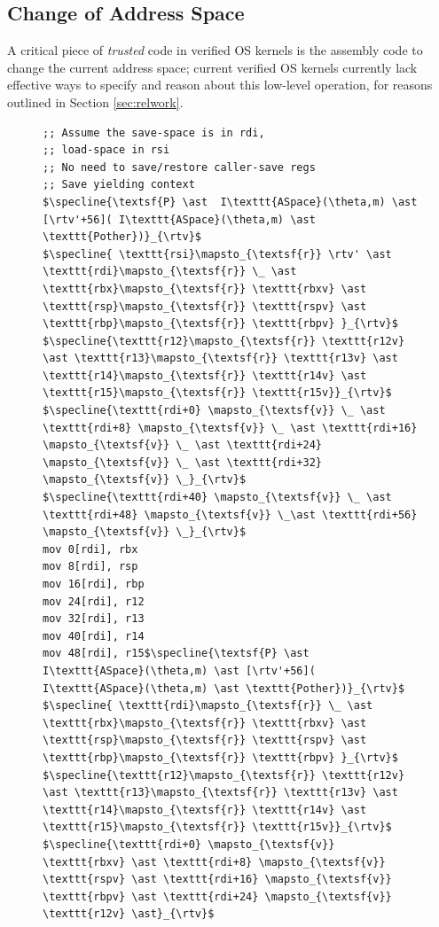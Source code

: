 \documentclass[acmsmall,screen,nonacm]{acmart}
\begin{document}
\subsection{Change of Address Space}
A critical piece of \emph{trusted} code in verified OS kernels is the assembly code to change the current address space; current verified OS kernels currently lack effective ways to specify and reason about this low-level operation, for reasons outlined in Section \ref{sec:relwork}.
\begin{figure}\footnotesize
\begin{lstlisting}
;; Assume the save-space is in rdi,
;; load-space in rsi
;; No need to save/restore caller-save regs
;; Save yielding context
$\specline{\textsf{P} \ast  I\texttt{ASpace}(\theta,m) \ast [\rtv'+56]( I\texttt{ASpace}(\theta,m) \ast \texttt{Pother})}_{\rtv}$
$\specline{ \texttt{rsi}\mapsto_{\textsf{r}} \rtv' \ast \texttt{rdi}\mapsto_{\textsf{r}} \_ \ast \texttt{rbx}\mapsto_{\textsf{r}} \texttt{rbxv} \ast  \texttt{rsp}\mapsto_{\textsf{r}} \texttt{rspv} \ast \texttt{rbp}\mapsto_{\textsf{r}} \texttt{rbpv} }_{\rtv}$
$\specline{\texttt{r12}\mapsto_{\textsf{r}} \texttt{r12v} \ast \texttt{r13}\mapsto_{\textsf{r}} \texttt{r13v} \ast \texttt{r14}\mapsto_{\textsf{r}} \texttt{r14v} \ast \texttt{r15}\mapsto_{\textsf{r}} \texttt{r15v}}_{\rtv}$
$\specline{\texttt{rdi+0} \mapsto_{\textsf{v}} \_ \ast \texttt{rdi+8} \mapsto_{\textsf{v}} \_ \ast \texttt{rdi+16} \mapsto_{\textsf{v}} \_ \ast \texttt{rdi+24} \mapsto_{\textsf{v}} \_ \ast \texttt{rdi+32} \mapsto_{\textsf{v}} \_}_{\rtv}$
$\specline{\texttt{rdi+40} \mapsto_{\textsf{v}} \_ \ast \texttt{rdi+48} \mapsto_{\textsf{v}} \_\ast \texttt{rdi+56} \mapsto_{\textsf{v}} \_}_{\rtv}$
mov 0[rdi], rbx
mov 8[rdi], rsp
mov 16[rdi], rbp
mov 24[rdi], r12
mov 32[rdi], r13
mov 40[rdi], r14
mov 48[rdi], r15$\specline{\textsf{P} \ast  I\texttt{ASpace}(\theta,m) \ast [\rtv'+56]( I\texttt{ASpace}(\theta,m) \ast \texttt{Pother})}_{\rtv}$
$\specline{ \texttt{rdi}\mapsto_{\textsf{r}} \_ \ast \texttt{rbx}\mapsto_{\textsf{r}} \texttt{rbxv} \ast  \texttt{rsp}\mapsto_{\textsf{r}} \texttt{rspv} \ast \texttt{rbp}\mapsto_{\textsf{r}} \texttt{rbpv} }_{\rtv}$
$\specline{\texttt{r12}\mapsto_{\textsf{r}} \texttt{r12v} \ast \texttt{r13}\mapsto_{\textsf{r}} \texttt{r13v} \ast \texttt{r14}\mapsto_{\textsf{r}} \texttt{r14v} \ast \texttt{r15}\mapsto_{\textsf{r}} \texttt{r15v}}_{\rtv}$
$\specline{\texttt{rdi+0} \mapsto_{\textsf{v}} \texttt{rbxv} \ast \texttt{rdi+8} \mapsto_{\textsf{v}} \texttt{rspv} \ast \texttt{rdi+16} \mapsto_{\textsf{v}} \texttt{rbpv} \ast \texttt{rdi+24} \mapsto_{\textsf{v}} \texttt{r12v} \ast}_{\rtv}$

\end{lstlisting}
\end{figure}
\end{document}
